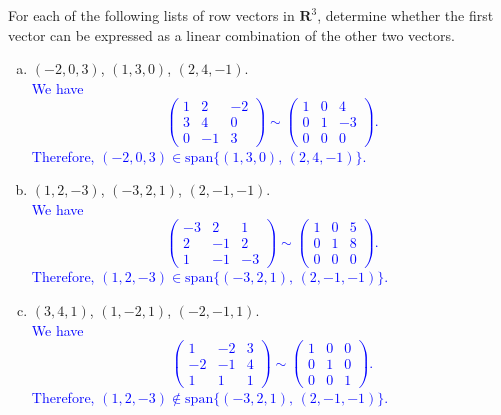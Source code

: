 \documentclass[a4paper,11pt]{article}
\newcommand{\R}{\mathbf{R}}
\newcommand{\BB}[1]{\textcolor{blue}{#1}}
\begin{document}
 For each of the following lists of row vectors in
$\R^3$, determine whether the first vector can be expressed as a linear
combination of the other two vectors.
\begin{enumerate}[(a)]
\item $(-2,0,3)$, $(1,3,0)$, $(2,4,-1)$. \\

  \BB{We have
    \[
      \left(
        \begin{array}{rr|r}
          1 & 2 & -2 \\
          3 & 4 & 0 \\
          0 & -1 & 3
        \end{array}
      \right) 
      \sim
      \left(
        \begin{array}{rr|r}
          1 & 0 & 4 \\
          0 & 1 & -3 \\
          0 & 0 & 0
        \end{array}
      \right).
    \]
    Therefore, $(-2,0,3) \in \text{span}\{(1,3,0),\,(2,4,-1)\}$. \\
  }

\item $(1,2,-3)$, $(-3,2,1)$, $(2,-1,-1)$. \\

  \BB{We have
    \[
      \left(
        \begin{array}{rr|r}
          -3 & 2 & 1 \\
          2 & -1 & 2 \\
          1 & -1 & -3
        \end{array}
      \right) 
      \sim
      \left(
        \begin{array}{rr|r}
          1 & 0 & 5 \\
          0 & 1 & 8 \\
          0 & 0 & 0
        \end{array}
      \right).
    \]
    Therefore, $(1,2,-3) \in \text{span}\{(-3,2,1),\,(2,-1,-1)\}$. \\
  }
  
\item $(3,4,1)$, $(1,-2,1)$, $(-2,-1,1)$. \\

  \BB{We have
    \[
      \left(
        \begin{array}{rr|r}
          1 & -2 & 3 \\
          -2 & -1 & 4 \\
          1 & 1 & 1
        \end{array}
      \right)
      \sim
      \left(
        \begin{array}{rr|r}
          1 & 0 & 0 \\
          0 & 1 & 0 \\
          0 & 0 & 1
        \end{array}
      \right).
    \]
    Therefore, $(1,2,-3) \notin \text{span}\{(-3,2,1),\,(2,-1,-1)\}$. \\
  }


\end{enumerate}
\end{document}
